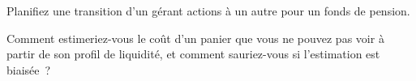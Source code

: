 \begin{interviewq}\label{iq:mx:portfolio-trades-and-risk-bids:5}
Planifiez une transition d'un gérant actions à un autre pour un fonds de pension.
\end{interviewq}

\begin{interviewq}\label{iq:mx:portfolio-trades-and-risk-bids:6}
Comment estimeriez-vous le coût d'un panier que vous ne pouvez pas voir à partir de son profil de liquidité, et comment sauriez-vous si l'estimation est biaisée~?
\end{interviewq}
